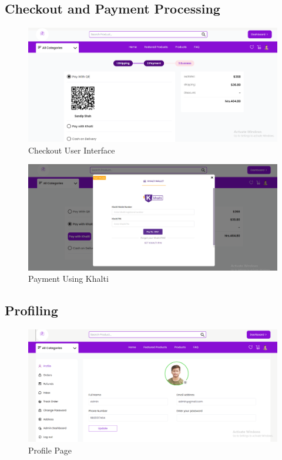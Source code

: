 \documentclass[12pt, a4paper, oneside]{article}
\begin{document}
\subsection*{ Checkout and Payment Processing}
\begin{figure}[!h]
\captionsetup{list=false}
\includegraphics[width=\linewidth ]{checkout_ui}
\centering
\caption{Checkout User Interface}
\label{fig:checkout_ui}
\end{figure}


\begin{figure}[!h]
 \captionsetup{list=false}
\includegraphics[width=\linewidth ]{khalti_widget}
\centering
\caption{Payment Using Khalti}
\label{fig:khalti_widget}
\end{figure}


\subsection*{ Profiling}
\begin{figure}[!h]
\captionsetup{list=false}
\includegraphics[width=\linewidth ]{profile_page}
\centering
\caption{Profile Page}
\label{fig:profile_page}
\end{figure}
\end{document}

